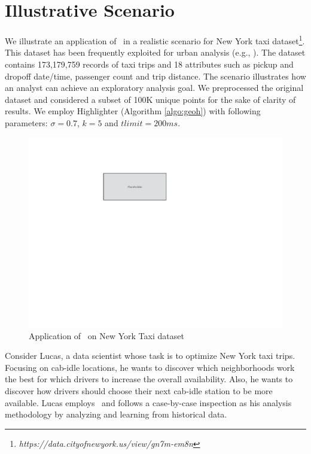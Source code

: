 \section{Illustrative Scenario}\label{sec:scenarios}
We illustrate an application of \framework\ in a realistic scenario for New York taxi dataset\footnote{\it https://data.cityofnewyork.us/view/gn7m-em8n}. This dataset has been frequently exploited for urban analysis
(e.g., \cite{DBLP:journals/debu/FreireCVZ16}).
The dataset contains 173,179,759 records of taxi trips and 18 attributes such as pickup and dropoff date/time, passenger count and trip distance.
The scenario illustrates how an analyst can achieve an exploratory analysis goal. We preprocessed the original dataset and considered a subset of 100K unique points for the sake of clarity of results. We employ {\sc Highlighter} (Algorithm \ref{algo:geoh}) with following parameters: $\sigma = 0.7$, $k = 5$ and $tlimit = 200ms$.

\begin{figure}
  \centering
  \includegraphics[width=\columnwidth]{figs/placeholder}
\caption{Application of \framework\ on New York Taxi dataset}
\label{fig:app}
\end{figure}

Consider Lucas, a data scientist whose task is to optimize New York taxi trips. Focusing on cab-idle locations, he wants to discover which neighborhoods work the best for which drivers to increase the overall availability. Also, he wants to discover how drivers should choose their next cab-idle station to be more available. Lucas employs \framework\ and follows a case-by-case inspection as his analysis methodology by analyzing and learning from historical data.

